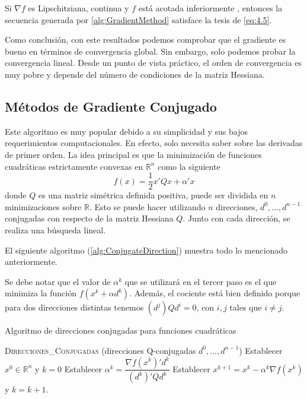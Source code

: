 \begin{proposicion}
Si $\nabla f$ es Lipschitziana, continua y $f$ está acotada inferiormente , entonces la secuencia generada por \ref{alg:GradientMethod} satisface la tesis de \ref{eq:4.5}.
\end{proposicion}

Como conclusión, con este resultados podemos comprobar que el gradiente es bueno en términos de convergencia global. 
Sin embargo, solo podemos probar la convergencia lineal. 
Desde un punto de vista práctico, el orden de convergencia es muy pobre y depende del número de condiciones de la matriz Hessiana.

\subsection{Métodos de Gradiente Conjugado}

Este algoritmo es muy popular debido a su simplicidad y sus bajos requerimientos computacionales. 
En efecto, solo necesita saber sobre las derivadas de primer orden. 
La idea principal es que la minimización de funciones cuadráticas estrictamente convexas en $\mathbb{R}^n$ como la siguiente
\begin{equation}
f(x) = \dfrac{1}{2}x'Qx+\alpha'x
\label{eq:4.17}
\end{equation}
donde $Q$ es una matriz simétrica definida positiva, puede ser dividida en $n$ minimizaciones sobre $\mathbb{R}$. 
Esto se puede hacer utilizando $n$ direcciones, $d^0,...,d^{n-1}$ conjugadas con respecto de la matriz Hessiana $Q$. 
Junto con cada dirección, se realiza una búsqueda lineal.

El siguiente algoritmo (\ref{alg:ConjugateDirection}) muestra todo lo mencionado anteriormente.

Se debe notar que el valor de $\alpha^k$ que se utilizará en el tercer paso es el que minimiza la función $f(x^k + \alpha d^k)$. 
Además, el cociente está bien definido porque para dos direcciones distintas tenemos $(d^j)Qd^i=0$, con $i,j$ tales que $i\neq j$.

\begin{algorithm}[H]
\caption{Algoritmo de direcciones conjugadas para funciones cuadráticas}\label{alg:ConjugateDirection}
\begin{algorithmic}[1]
\Procedure \textsc{Direcciones\_Conjugadas} (direcciones Q-conjugadas $d^0,...,d^{n-1}$)
\State Establecer $x^0\in\mathbb{R}^n$ y $k=0$
	\State Establecer $\alpha^k = \dfrac{\nabla f(x^k)'d^k}{(d^k)'Qd^k}$
	\State Establecer $x^{k+1} = x^k - \alpha^k\nabla f(x^k)$ y $k=k+1$.
\EndWhile
\EndProcedure
\end{algorithmic}
\end{algorithm}

